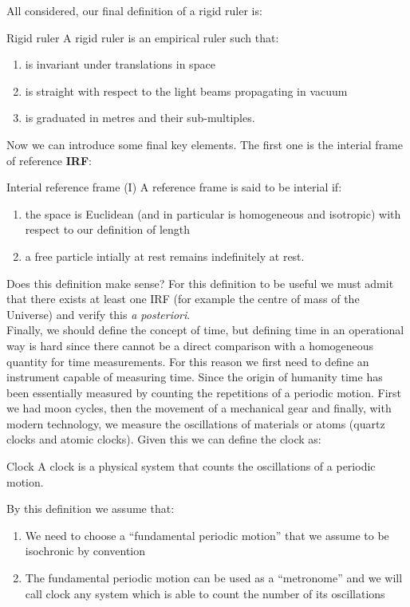 All considered, our final definition of a rigid ruler is:
\begin{definition}{Rigid ruler}
  A rigid ruler is an empirical ruler such that:
  \begin{enumerate}
    \item is invariant under translations in space
    \item is straight with respect to the light beams propagating in vacuum
    \item is graduated in metres and their sub-multiples.
  \end{enumerate}
\end{definition}
Now we can introduce some final key elements. The first one is the interial frame of reference \textbf{IRF}:
\begin{definition}{Interial reference frame (I)}
  A reference frame is said to be interial if:
  \begin{enumerate}
    \item the space is Euclidean (and in particular is homogeneous and isotropic) with respect to our definition of length
    \item a free particle intially at rest remains indefinitely at rest.
  \end{enumerate}
\end{definition}
Does this definition make sense? For this definition to be useful we must admit that there exists at least one IRF (for example the centre of mass of the Universe) and verify this \textit{a posteriori}.\\
Finally, we should define the concept of time, but defining time in an operational way is hard since there cannot be a direct comparison with a homogeneous quantity for time measurements. For this reason we first need to define an instrument capable of measuring time. Since the origin of humanity time has been essentially measured by counting the repetitions of a periodic motion. First we had moon cycles, then the movement of a mechanical gear and finally, with modern technology, we measure the oscillations of materials or atoms (quartz clocks and atomic clocks). Given this we can define the clock as:
\begin{definition}{Clock}
  A clock is a physical system that counts the oscillations of a periodic motion.
\end{definition}
By this definition we assume that:
\begin{enumerate}
  \item We need to choose a ``fundamental periodic motion'' that we assume to be isochronic by convention
  \item The fundamental periodic motion can be used as a ``metronome'' and we will call clock any system which
  is able to count the number of its oscillations
\end{enumerate}
